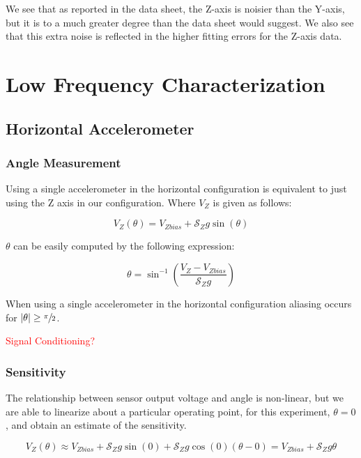 \documentclass{article}
\newcommand{\xxx}[1]{\textcolor{red}{#1}}
\theoremstyle{plain}
\theoremstyle{definition}
\theoremstyle{remark}
\newcommand{\Sens}{\mathcal{S}}
\begin{document}
We see that as reported in the data sheet, the Z-axis is noisier than the Y-axis, but it is to a much greater degree than the data sheet would suggest.  We also see that this extra noise is reflected in the higher fitting errors for the Z-axis data.  


\clearpage
\section{Low Frequency Characterization}

\subsection{Horizontal Accelerometer}

\subsubsection{Angle Measurement}

Using a single accelerometer in the horizontal configuration is equivalent to just using the Z axis in our configuration.  Where $V_{Z}$ is given as follows: 

$$ V_{Z}(\theta) = V_{Zbias} + \Sens_{Z} g \sin(\theta) $$

$\theta$ can be easily computed by the following expression:

\begin{equation}
\theta = \sin^{-1}\left( \frac{V_{Z} - V_{Zbias}}{\Sens_{Z} g}\right) 
\label{horizontalEQ}
\end{equation}

When using a single accelerometer in the horizontal configuration aliasing occurs for $|\theta| \geq \sfrac{\pi}{2}$.

\xxx{Signal Conditioning?}

\subsubsection{Sensitivity}

The relationship between sensor output voltage and angle is non-linear, but we are able to linearize about a particular operating point, for this experiment, $\theta = 0$, and obtain an estimate of the sensitivity.

$$ V_{Z}(\theta) \approx V_{Zbias} + \Sens_{Z} g \sin(0) + \Sens_{Z} g \cos(0) \left(\theta - 0\right) = V_{Zbias} + \Sens_{Z} g \theta $$
\end{document}
